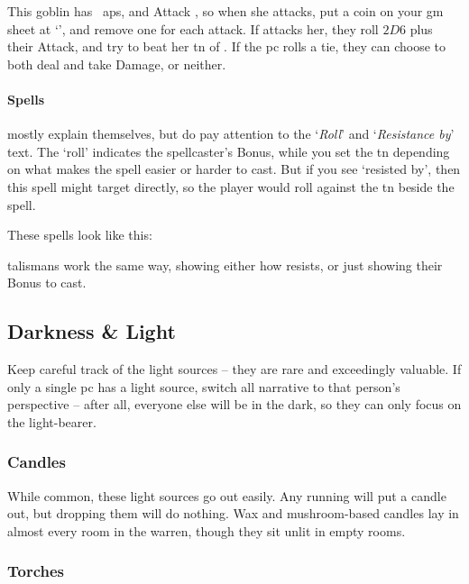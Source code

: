 \begin{multicols}{2}
{  

  This goblin has ~\glspl{ap}, and Attack , so when she attacks, put a coin on your \gls{gm} sheet at `', and remove one for each attack.
  If  attacks her, they roll $2D6$ plus their Attack, and try to beat her \gls{tn} of .
  If the \gls{pc} rolls a tie, they can choose to both deal and take Damage, or neither.

  \paragraph{Spells}
  mostly explain themselves, but do pay attention to the `\textit{Roll}' and `\textit{Resistance by}' text.
  The `roll' indicates the spellcaster's Bonus, while you set the \gls{tn} depending on what makes the spell easier or harder to cast.
  But if you see `resisted by', then this spell might target  directly, so the player would roll against the \gls{tn} beside the spell.

  These spells look like this:

  \begin{exampletext}
    \showStdSpells
  \end{exampletext}

  \Glspl{talisman} work the same way, showing either how  resists, or just showing their Bonus to cast.
}{}

\subsection{Darkness \& Light}

Keep careful track of the light sources -- they are rare and exceedingly valuable.
If only a single \gls{pc} has a light source, switch all narrative to that person's perspective -- after all, everyone else will be in the dark, so they can only focus on the light-bearer.

\subsubsection{Candles}

While common, these light sources go out easily.
Any running will put a candle out, but dropping them will do nothing.
Wax and mushroom-based candles lay in almost every room in the \gls{warren}, though they sit unlit in empty rooms.

\subsubsection{Torches}


\end{multicols}
